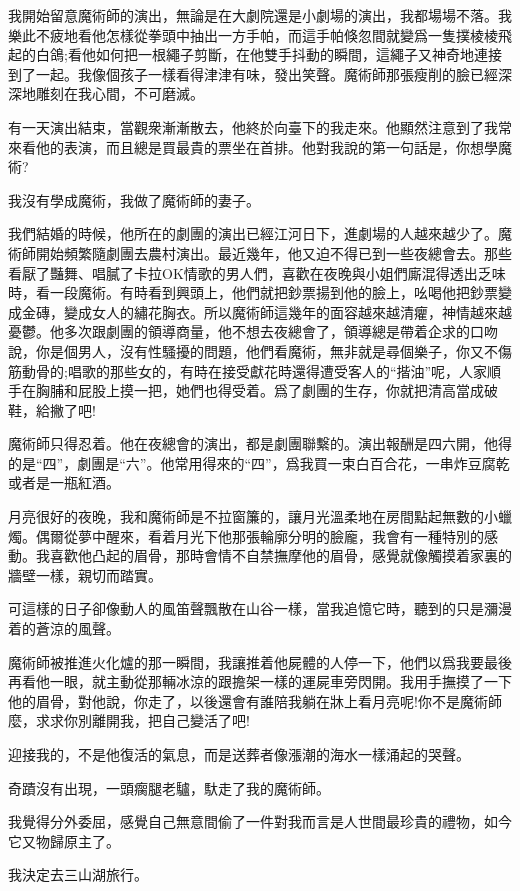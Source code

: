 \documentclass[a6paper]{article}
\begin{document}
我開始留意魔術師的演出，無論是在大劇院還是小劇場的演出，我都場場不落。我樂此不疲地看他怎樣從拳頭中抽出一方手帕，而這手帕倏忽間就變爲一隻撲棱棱飛起的白鴿;看他如何把一根繩子剪斷，在他雙手抖動的瞬間，這繩子又神奇地連接到了一起。我像個孩子一樣看得津津有味，發出笑聲。魔術師那張瘦削的臉已經深深地雕刻在我心間，不可磨滅。

有一天演出結束，當觀衆漸漸散去，他終於向臺下的我走來。他顯然注意到了我常來看他的表演，而且總是買最貴的票坐在首排。他對我說的第一句話是，你想學魔術?

我沒有學成魔術，我做了魔術師的妻子。

我們結婚的時候，他所在的劇團的演出已經江河日下，進劇場的人越來越少了。魔術師開始頻繁隨劇團去農村演出。最近幾年，他又迫不得已到一些夜總會去。那些看厭了豔舞、唱膩了卡拉OK情歌的男人們，喜歡在夜晚與小姐們廝混得透出乏味時，看一段魔術。有時看到興頭上，他們就把鈔票揚到他的臉上，吆喝他把鈔票變成金磚，變成女人的繡花胸衣。所以魔術師這幾年的面容越來越清癯，神情越來越憂鬱。他多次跟劇團的領導商量，他不想去夜總會了，領導總是帶着企求的口吻說，你是個男人，沒有性騷擾的問題，他們看魔術，無非就是尋個樂子，你又不傷筋動骨的;唱歌的那些女的，有時在接受獻花時還得遭受客人的“揩油”呢，人家順手在胸脯和屁股上摸一把，她們也得受着。爲了劇團的生存，你就把清高當成破鞋，給撇了吧!

魔術師只得忍着。他在夜總會的演出，都是劇團聯繫的。演出報酬是四六開，他得的是“四”，劇團是“六”。他常用得來的“四”，爲我買一束白百合花，一串炸豆腐乾或者是一瓶紅酒。

月亮很好的夜晚，我和魔術師是不拉窗簾的，讓月光溫柔地在房間點起無數的小蠟燭。偶爾從夢中醒來，看着月光下他那張輪廓分明的臉龐，我會有一種特別的感動。我喜歡他凸起的眉骨，那時會情不自禁撫摩他的眉骨，感覺就像觸摸着家裏的牆壁一樣，親切而踏實。

可這樣的日子卻像動人的風笛聲飄散在山谷一樣，當我追憶它時，聽到的只是瀰漫着的蒼涼的風聲。

魔術師被推進火化爐的那一瞬間，我讓推着他屍體的人停一下，他們以爲我要最後再看他一眼，就主動從那輛冰涼的跟擔架一樣的運屍車旁閃開。我用手撫摸了一下他的眉骨，對他說，你走了，以後還會有誰陪我躺在牀上看月亮呢!你不是魔術師麼，求求你別離開我，把自己變活了吧!

迎接我的，不是他復活的氣息，而是送葬者像漲潮的海水一樣涌起的哭聲。

奇蹟沒有出現，一頭瘸腿老驢，馱走了我的魔術師。

我覺得分外委屈，感覺自己無意間偷了一件對我而言是人世間最珍貴的禮物，如今它又物歸原主了。

我決定去三山湖旅行。
\end{document}
